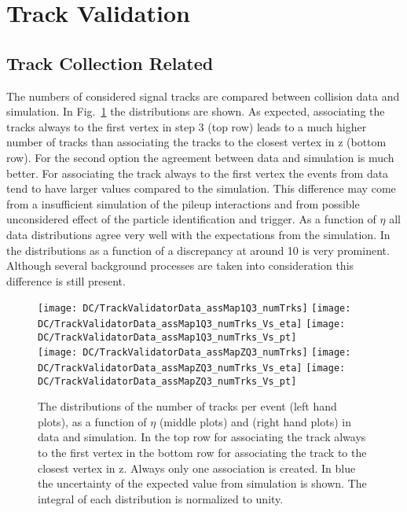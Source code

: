 \section{Track Validation \label{sec:DCTV}}

\subsection{Track Collection Related  \label{sec:DCTVTC}}

The numbers of considered signal tracks are compared between collision data and simulation. In Fig.~\ref{plot:DCTVTDQual} the distributions are shown. As expected, associating the tracks always to the first vertex in step 3 (top row) leads to a much higher number of tracks than associating the tracks to the closest vertex in z (bottom row). For the second option the agreement between data and simulation is much better. For associating the track always to the first vertex the events from data tend to have larger values compared to the simulation. This difference may come from a insufficient simulation of the pileup interactions and from possible unconsidered effect of the  particle identification and trigger. As a function of $\eta$ all data distributions agree very well with the expectations from the simulation. In the distributions as a function of \pt{} a discrepancy at around 10\GeV{} is very prominent. Although several background processes are taken into consideration this difference is still present.

\begin{figure}[Ht]
  \centering
  \texttt{[image: DC/TrackValidatorData\_assMap1Q3\_numTrks]}
  \texttt{[image: DC/TrackValidatorData\_assMap1Q3\_numTrks\_Vs\_eta]}
  \texttt{[image: DC/TrackValidatorData\_assMap1Q3\_numTrks\_Vs\_pt]}
  \\
  \texttt{[image: DC/TrackValidatorData\_assMapZQ3\_numTrks]}
  \texttt{[image: DC/TrackValidatorData\_assMapZQ3\_numTrks\_Vs\_eta]}
  \texttt{[image: DC/TrackValidatorData\_assMapZQ3\_numTrks\_Vs\_pt]}
  \caption[Track number and distribution in data and simulation of two options of the association map]{The distributions of the number of tracks per event (left hand plots), as a function of $\eta$ (middle plots) and \pt (right hand plots) in data and simulation. In the top row for associating the track always to the first vertex in the bottom row for associating the track to the closest vertex in z. Always only one association is created. In blue the uncertainty of the expected value from simulation is shown. The integral of each distribution is normalized to unity. \label{plot:DCTVTDQual}}
\end{figure}

